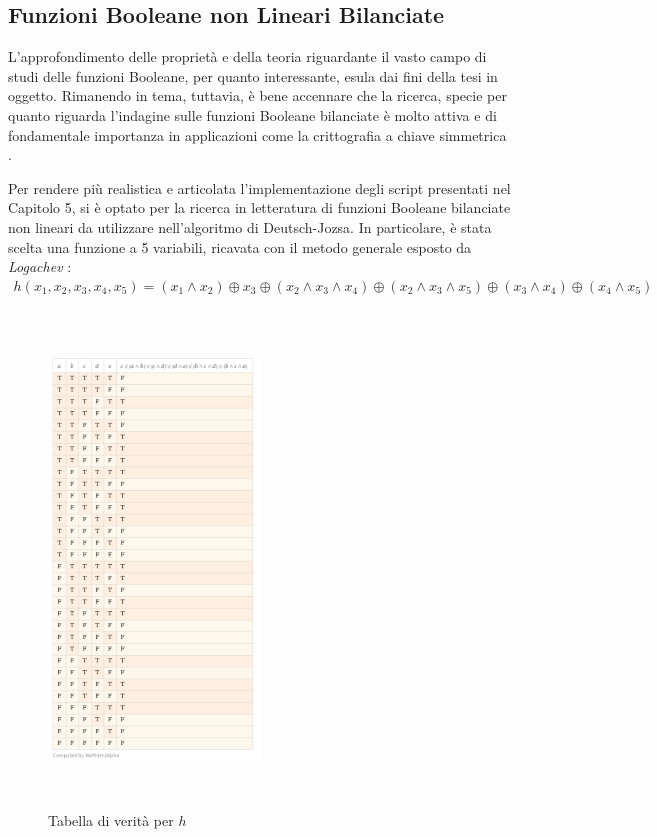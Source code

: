 \documentclass[12pt,a4paper,openright]{report}
\newcommand*\xor{\mathbin{\oplus}}
\begin{document}
\subsection{Funzioni Booleane non Lineari Bilanciate}
L'approfondimento delle proprietà e della teoria riguardante il vasto campo di studi delle funzioni Booleane, per quanto interessante, esula dai fini della tesi in oggetto.
Rimanendo in tema, tuttavia, è bene accennare che la ricerca, specie per quanto riguarda l'indagine sulle funzioni Booleane bilanciate è molto attiva e di fondamentale importanza in applicazioni come la crittografia a chiave simmetrica \cite{ref4}.
\par Per rendere più realistica e articolata l'implementazione degli script presentati nel Capitolo 5, si è optato per la ricerca in letteratura di funzioni Booleane bilanciate non lineari
da utilizzare nell'algoritmo di Deutsch-Jozsa. In particolare, è stata scelta una funzione a 5 variabili, ricavata con il metodo generale esposto da \textit{Logachev} \cite{ref5}:
    \begin{align*}
            h(x_1, x_2, x_3, x_4, x_5)=(x_1 \land x_2) \xor x_3 \xor (x_2 \land x_3 \land x_4) \xor (x_2 \land x_3 \land x_5) \xor (x_3 \land x_4) \xor (x_4 \land x_5)
    \end{align*}



\begin{figure}[h]
     \centering
     \includegraphics[width=0.5\textwidth,height=13.1cm]{computedFBBtrueTable}
     \caption{Tabella di verità per $h$}
\end{figure}
    
\end{document}
